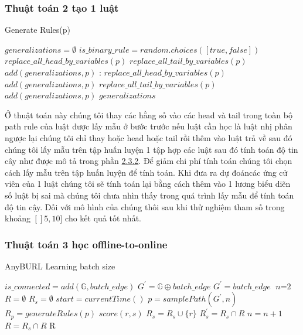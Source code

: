 \subsubsection{Thuật toán 2 tạo 1 luật}
\begin{algorithm}
\caption{Generate Rules(p)}\label{euclid}
\begin{algorithmic}[1]
\State $\textit{generalizations} = \emptyset$
\State $is\_binary\_rule = random.choices([true,false])$
	\State $replace\_all\_head\_by\_variables(p)$
	\State $replace\_all\_tail\_by\_variables(p)$
	\State $add(generalizations, p)$
\Else:
    \State $replace\_all\_head\_by\_variables(p)$
    \State $add(generalizations, p)$
    \State $replace\_all\_tail\_by\_variables(p)$
	\State $add(generalizations, p)$
\EndIf
\Return $generalizations$
\EndProcedure
\end{algorithmic}
\end{algorithm}

Ở thuật toán này chúng tôi thay các hằng số vào các head và tail trong toàn bộ path rule  của luật được lấy mẫu ở bước trước nếu luật cần học là luật nhị phân ngược lại chúng tôi chỉ thay hoặc head hoặc tail rồi thêm vào luật trả về sau đó chúng tôi lấy mẫu trên tập huấn luyện 1 tập hợp các luật sau đó tính toán độ tin cây như được mô tả trong phần \hyperref[kg]{2.3.2}. Để giảm chi phí tính toán chúng tôi chọn cách lấy mẫu trên tập huấn luyện để tính toán. Khi đưa ra dự đoáncác ứng cử viên của 1 luật chúng tôi sẽ tính toán lại bằng cách thêm vào 1 lương biểu diẽn số luật bị sai mà chúng tôi chưa nhìn thấy trong quá trình lấy mẫu để tính toán độ tin cậy. Dối với mô hình của chúng thôi sau khi thử nghiệm tham số trong khoảng \([]5, 10]\) cho kết quả tốt nhất.

\subsubsection{Thuật toán 3 học offline-to-online}
\begin{algorithm}
\caption{AnyBURL Learning batch size}\label{euclid}
\begin{algorithmic}[1]
\State $is\_connected = add(\mathbb{G}, batch\_edge)$
	\State  $ G^{\prime} = \mathbb{G} \oplus batch\_edge$
\Else
    \State  $ G^{\prime} = batch\_edge$
\EndIf
\State $\textit{n} = \text{2}$
\State $R = \emptyset$
\Loop
\State $R_s = \emptyset$
\State $start = currentTime()$
\Repeat
\State $p = samplePath(G^{\prime}, n)$
\State $R_p = generateRules(p)$
\State $score(r, s)$
	\State $R_s = R_s \cup \{r\}$
\EndIf
\EndFor
{}
\State $R^{\prime}_s = R_s \cap R$
	\State $n = n + 1$
\EndIf
\State $R = R_s \cap R$
\EndLoop
\Return R
\EndProcedure
\end{algorithmic}
\end{algorithm}

